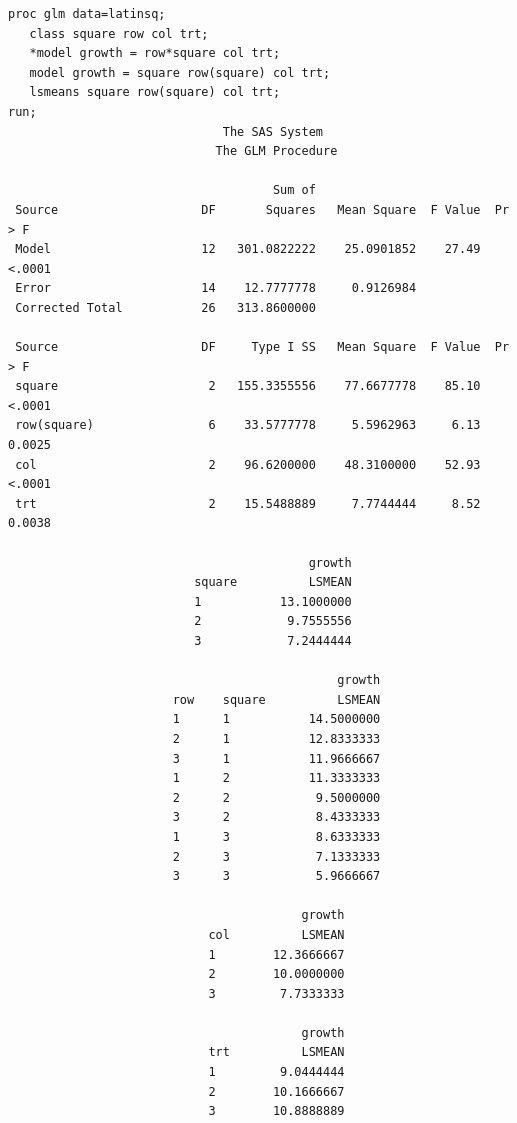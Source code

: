 \newpage
\begin{small}
\begin{verbatim}
proc glm data=latinsq;
   class square row col trt;
   *model growth = row*square col trt;
   model growth = square row(square) col trt;
   lsmeans square row(square) col trt;
run; 
                              The SAS System                              
                             The GLM Procedure

                                     Sum of
 Source                    DF       Squares   Mean Square  F Value  Pr > F
 Model                     12   301.0822222    25.0901852    27.49  <.0001
 Error                     14    12.7777778     0.9126984                 
 Corrected Total           26   313.8600000                               

 Source                    DF     Type I SS   Mean Square  F Value  Pr > F
 square                     2   155.3355556    77.6677778    85.10  <.0001
 row(square)                6    33.5777778     5.5962963     6.13  0.0025
 col                        2    96.6200000    48.3100000    52.93  <.0001
 trt                        2    15.5488889     7.7744444     8.52  0.0038

                                          growth
                          square          LSMEAN
                          1           13.1000000
                          2            9.7555556
                          3            7.2444444

                                              growth
                       row    square          LSMEAN
                       1      1           14.5000000
                       2      1           12.8333333
                       3      1           11.9666667
                       1      2           11.3333333
                       2      2            9.5000000
                       3      2            8.4333333
                       1      3            8.6333333
                       2      3            7.1333333
                       3      3            5.9666667

                                         growth
                            col          LSMEAN
                            1        12.3666667
                            2        10.0000000
                            3         7.7333333

                                         growth
                            trt          LSMEAN
                            1         9.0444444
                            2        10.1666667
                            3        10.8888889
\end{verbatim}
\end{small}
